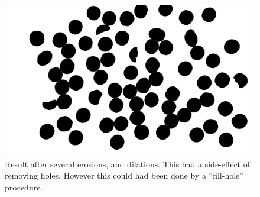 \documentclass{article}
\begin{document}
\begin{figure}[H]
\centering
\includegraphics[width=0.7\linewidth]{pics/grey_pic_all_bin_grad_1}
\caption{Result after several erosions, and dilations. This had a side-effect of removing holes. However this could had been done by a “fill-hole” procedure.}
\label{fig:greypicallbingrad-1}
\end{figure}
\end{document}
